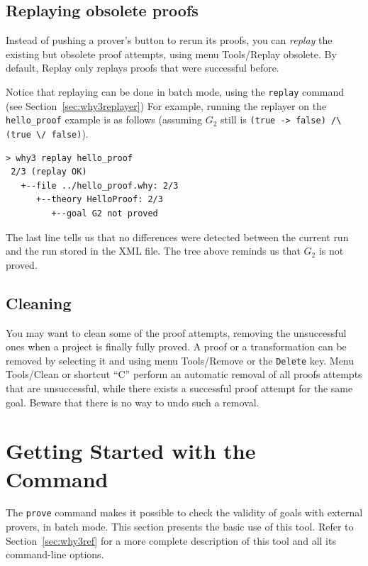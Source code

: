 \subsection{Replaying obsolete proofs}

Instead of pushing a prover's button to rerun its proofs, you can
\emph{replay} the existing but obsolete
proof attempts, using menu
\textsf{Tools/Replay obsolete}. By default, \textsf{Replay} only replays
proofs that were successful before.

Notice that replaying can be done in batch mode, using the
\texttt{replay} command (see Section~\ref{sec:why3replayer}) For
example, running the replayer on the \texttt{hello\_proof} example is
as follows (assuming $G_2$ still is
\lstinline|(true -> false) /\ (true \/ false)|).
\begin{verbatim}
> why3 replay hello_proof
 2/3 (replay OK)
   +--file ../hello_proof.why: 2/3
      +--theory HelloProof: 2/3
         +--goal G2 not proved
\end{verbatim}
The last line tells us that no differences were detected between the
current run and the run stored in the XML file. The tree above
reminds us that $G_2$ is not proved.

\subsection{Cleaning}

You may want to clean some of the proof attempts, \eg removing the
unsuccessful ones when a project is finally fully proved.
A proof or a transformation can be removed by selecting it and
using menu \textsf{Tools/Remove} or the \texttt{Delete} key.
Menu \textsf{Tools/Clean} or shortcut ``C'' perform an automatic removal of all
proofs attempts that are unsuccessful, while there exists a successful proof
attempt for the same goal.
Beware that there is no way to undo such a removal.

\section{Getting Started with the \why Command}
\label{sec:batch}

The \texttt{prove} command makes it possible to check the validity of goals with external
provers, in batch mode. This section presents the basic use of this
tool. Refer to Section~\ref{sec:why3ref} for a more complete
description of this tool and all its command-line options.

